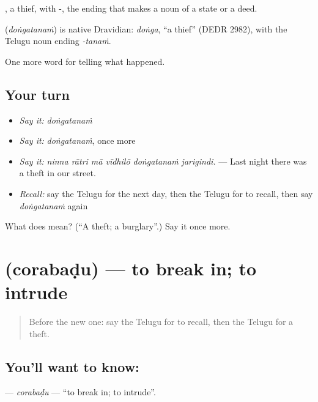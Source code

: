 , a thief, with -, the ending that makes a noun of a state or a deed.

\begin{cousinweb}
\textbf{} (\emph{doṅgatanaṁ}) is native Dravidian: \emph{doṅga}, \textquotedblleft{}a thief\textquotedblright{} (DEDR 2982), with the Telugu noun ending \emph{-tanaṁ}.
\end{cousinweb}

\begin{grammarlens}[title={What you've built}]
One more word for telling what happened.
\end{grammarlens}

\subsection*{Your turn}
\begin{itemize}
\raggedright
  \item \emph{Say it:} \emph{doṅgatanaṁ}
  \item \emph{Say it:} \emph{doṅgatanaṁ}, once more
  \item \emph{Say it:} \emph{ninna rātri mā vīdhilō doṅgatanaṁ jarigindi.} — Last night there was a theft in our street.
  \item \emph{Recall:} say the Telugu for the next day, then the Telugu for to recall, then say \emph{doṅgatanaṁ} again
\end{itemize}

\begin{tcolorbox}[breakable,colback=teal!4,colframe=teal!35!black,title={Before you move on}]
What does  mean? (\textquotedblleft{}A theft; a burglary\textquotedblright{}.) Say it once more.
\end{tcolorbox}
\section[\texorpdfstring{\te{చొరబడు} (corabaḍu)}{చొరబడు (corabaḍu)}]{ (corabaḍu) — to break in; to intrude}

\label{lesson:TE-C329-corabadu}



\begin{quote}
Before the new one: say the Telugu for to recall, then the Telugu for a theft.
\end{quote}

\subsection*{You'll want to know: }
\textbf{} — \emph{corabaḍu} — \textquotedblleft{}to break in; to intrude\textquotedblright{}.

